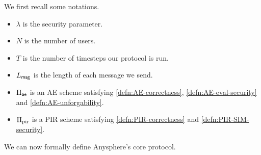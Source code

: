 We first recall some notations.
\begin{itemize}
    \item $\lambda$ is the security parameter.
    \item $N$ is the number of users.
    \item $T$ is the number of timesteps our protocol is run.
    \item $L_{\mathsf{msg}}$ is the length of each message we send.
    \item $\Pi_{\mathsf{ae}}$ is an AE scheme satisfying \cref{defn:AE-correctness}, \cref{defn:AE-eval-security} and \cref{defn:AE-unforgability}.
    \item $\Pi_{\text{pir}}$ is a PIR scheme satisfying \cref{defn:PIR-correctness} and \cref{defn:PIR-SIM-security}.
\end{itemize}
We can now formally define Anysphere's core protocol.
